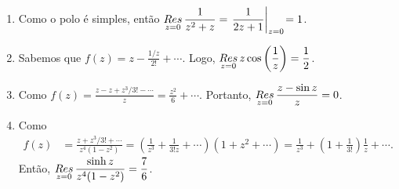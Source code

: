 
\begin{questions}

%
\begin{solution}
\begin{enumerate}[label=(\alph*)]
    \item Como o polo é simples, então $\displaystyle \mathop{Res}\limits_{z=0} \frac{1}{z^2+z} = \left.\frac{1}{2z+1}\right|_{z=0} \!= 1$.

    \item Sabemos que $\displaystyle f(z) = z - \frac{1/z}{2!} + \cdots$. Logo,
    $\displaystyle \mathop{Res}\limits_{z=0} z\cos\left(\frac{1}{z}\right) = \frac{1}{2}$.
    
    \item Como $\displaystyle f(z) = \frac{z - z + z^3/3! - \cdots}{z} = \frac{z^2}{6} + \cdots$. Portanto, $\displaystyle \mathop{Res}\limits_{z=0} \frac{z - \sin z}{z} = 0$.
    
    \item Como 
    \begin{align*}
        f(z) &= \frac{z + z^3/3! + \cdots}{z^4(1 - z^2)}
            = \left( \frac{1}{z^3} + \frac{1}{3! z} + \cdots \right) \left(1 + z^2 + \cdots \right)
            = \frac{1}{z^3} + \left(1+\frac{1}{3!}\right)\frac{1}{z}+\cdots.
    \end{align*}
    Então, $\displaystyle \mathop{Res}\limits_{z=0} \frac{\sinh z}{z^4(1 - z^2)} = \frac{7}{6}$.
\end{enumerate}
\end{solution}


\end{questions}
